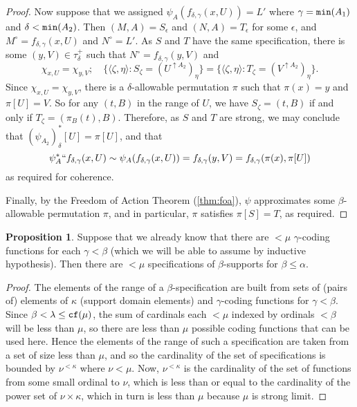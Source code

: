 \documentclass{article}
\theoremstyle{definition}
\newtheorem{proposition}[theorem]{Proposition}
\theoremstyle{remark}
\begin{document}
\begin{proof}
Now suppose that we assigned $\psi_A(f_{\delta,\gamma}(x, U)) = L'$ where $\gamma = {\tt min}(A_1)$ and $\delta < {\tt min}(A_2)$.
Then $(M,A) = S_\epsilon$ and $(N,A) = T_\epsilon$ for some $\epsilon$, and $M^\circ = f_{\delta,\gamma}(x,U)$ and $N^\circ = L'$.
As $S$ and $T$ have the same specification, there is some $(y,V) \in \tau_\delta^+$ such that $N^\circ = f_{\delta,\gamma}(y,V)$ and
$$ \chi_{x,U} = \chi_{y,V};\quad \{ \langle \zeta, \eta \rangle : S_\zeta = (U^{\uparrow A_2})_\eta \} = \{ \langle \zeta, \eta \rangle : T_\zeta = (V^{\uparrow A_2})_\eta \}. $$
Since $\chi_{x,U} = \chi_{y,V}$, there is a $\delta$-allowable permutation $\pi$ such that $\pi(x) = y$ and $\pi[U] = V$.
So for any $(t,B)$ in the range of $U$, we have $S_\zeta = (t,B)$ if and only if $T_\zeta = (\pi_B(t),B)$.
Therefore, as $S$ and $T$ are strong, we may conclude that $(\psi_{A_2})_\delta^*[U] = \pi[U]$, and that
$$ \psi^*_A `` f_{\delta,\gamma}(x,U) \sim \psi_A(f_{\delta,\gamma}(x,U)) =  f_{\delta,\gamma}(y,V) = f_{\delta,\gamma}(\pi(x),\pi[U]) $$
as required for coherence.

Finally, by the Freedom of Action Theorem (\ref{thm:foa}), $\psi$ approximates some $\beta$-allowable permutation $\pi$, and in particular, $\pi$ satisfies $\pi[S] = T$, as required.
\end{proof}

\begin{proposition}\label{prop:count_spec}
Suppose that we already know that there are $<\mu$ $\gamma$-coding functions for each $\gamma<\beta$ (which we will be able to assume by inductive hypothesis).
Then there are $<\mu$ specifications of $\beta$-supports for $\beta\leq \alpha$.
\end{proposition}
\begin{proof}
The elements of the range of a $\beta$-specification are built from sets of (pairs of) elements of $\kappa$ (support domain elements) and $\gamma$-coding functions for $\gamma < \beta$.
Since $\beta < \lambda \leq {\tt cf}(\mu)$, the sum of cardinals each $<\mu$ indexed by ordinals $<\beta$ will be less than $\mu$, so there are less than $\mu$ possible coding functions that can be used here.
Hence the elements of the range of such a specification are taken from a set of size less than $\mu$, and so the cardinality of the set of specifications is bounded by $\nu^{<\kappa}$ where $\nu < \mu$.
Now, $\nu^{<\kappa}$ is the cardinality of the set of functions from some small ordinal to $\nu$, which is less than or equal to the cardinality of the power set of $\nu \times \kappa$, which in turn is less than $\mu$ because $\mu$ is strong limit.
\end{proof}
\end{document}
